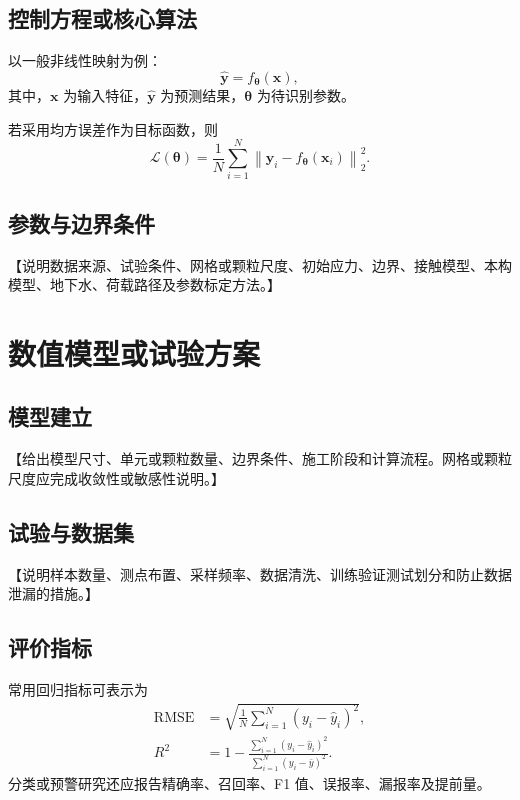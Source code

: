 \documentclass[UTF8,zihao=-5,twoside]{ctexart}
\numberwithin{equation}{section}
\newcommand{\placeholder}[1]{\textcolor{paperblack}{【#1】}}
\begin{document}
\subsection{控制方程或核心算法}
以一般非线性映射为例：
\begin{equation}
  \hat{\bm{y}}=f_{\bm{\theta}}(\bm{x}),
  \label{eq:model}
\end{equation}
其中，$\bm{x}$ 为输入特征，$\hat{\bm{y}}$ 为预测结果，$\bm{\theta}$ 为待识别参数。

若采用均方误差作为目标函数，则
\begin{equation}
  \mathcal{L}(\bm{\theta})
  =\frac{1}{N}\sum_{i=1}^{N}
  \left\lVert \bm{y}_i-f_{\bm{\theta}}(\bm{x}_i)\right\rVert_2^2.
  \label{eq:loss}
\end{equation}

\subsection{参数与边界条件}
\placeholder{说明数据来源、试验条件、网格或颗粒尺度、初始应力、边界、接触模型、本构模型、地下水、荷载路径及参数标定方法。}

\section{数值模型或试验方案}

\subsection{模型建立}
\placeholder{给出模型尺寸、单元或颗粒数量、边界条件、施工阶段和计算流程。网格或颗粒尺度应完成收敛性或敏感性说明。}

\subsection{试验与数据集}
\placeholder{说明样本数量、测点布置、采样频率、数据清洗、训练验证测试划分和防止数据泄漏的措施。}

\subsection{评价指标}
常用回归指标可表示为
\begin{align}
  \mathrm{RMSE} &=
  \sqrt{\frac{1}{N}\sum_{i=1}^{N}(y_i-\hat{y}_i)^2},\\
  R^2 &=1-\frac{\sum_{i=1}^{N}(y_i-\hat{y}_i)^2}
  {\sum_{i=1}^{N}(y_i-\bar{y})^2}.
\end{align}
分类或预警研究还应报告精确率、召回率、F1 值、误报率、漏报率及提前量。
\end{document}
